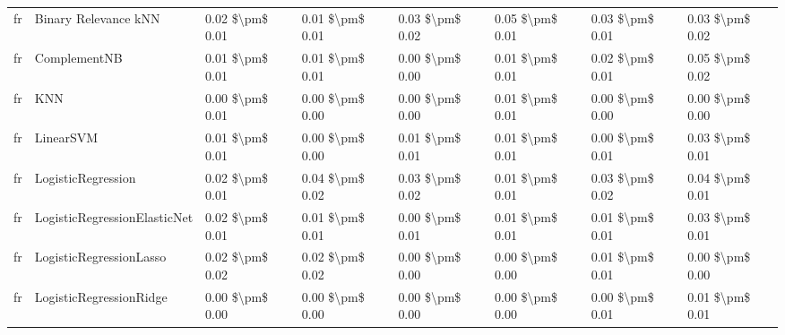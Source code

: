 \begin{tabular}{llllllll}
      fr &            Binary Relevance kNN & 0.02 \$\textbackslash pm\$ 0.01 &           0.01 \$\textbackslash pm\$ 0.01 &       0.03 \$\textbackslash pm\$ 0.02 &        0.05 \$\textbackslash pm\$ 0.01 &                         0.03 \$\textbackslash pm\$ 0.01 &     0.03 \$\textbackslash pm\$ 0.02 \\
      fr &                    ComplementNB & 0.01 \$\textbackslash pm\$ 0.01 &           0.01 \$\textbackslash pm\$ 0.01 &       0.00 \$\textbackslash pm\$ 0.00 &        0.01 \$\textbackslash pm\$ 0.01 &                         0.02 \$\textbackslash pm\$ 0.01 &     0.05 \$\textbackslash pm\$ 0.02 \\
      fr &                             KNN & 0.00 \$\textbackslash pm\$ 0.01 &           0.00 \$\textbackslash pm\$ 0.00 &       0.00 \$\textbackslash pm\$ 0.00 &        0.01 \$\textbackslash pm\$ 0.01 &                         0.00 \$\textbackslash pm\$ 0.00 &     0.00 \$\textbackslash pm\$ 0.00 \\
      fr &                       LinearSVM & 0.01 \$\textbackslash pm\$ 0.01 &           0.00 \$\textbackslash pm\$ 0.00 &       0.01 \$\textbackslash pm\$ 0.01 &        0.01 \$\textbackslash pm\$ 0.01 &                         0.00 \$\textbackslash pm\$ 0.01 &     0.03 \$\textbackslash pm\$ 0.01 \\
      fr &              LogisticRegression & 0.02 \$\textbackslash pm\$ 0.01 &           0.04 \$\textbackslash pm\$ 0.02 &       0.03 \$\textbackslash pm\$ 0.02 &        0.01 \$\textbackslash pm\$ 0.01 &                         0.03 \$\textbackslash pm\$ 0.02 &     0.04 \$\textbackslash pm\$ 0.01 \\
      fr &    LogisticRegressionElasticNet & 0.02 \$\textbackslash pm\$ 0.01 &           0.01 \$\textbackslash pm\$ 0.01 &       0.00 \$\textbackslash pm\$ 0.01 &        0.01 \$\textbackslash pm\$ 0.01 &                         0.01 \$\textbackslash pm\$ 0.01 &     0.03 \$\textbackslash pm\$ 0.01 \\
      fr &         LogisticRegressionLasso & 0.02 \$\textbackslash pm\$ 0.02 &           0.02 \$\textbackslash pm\$ 0.02 &       0.00 \$\textbackslash pm\$ 0.00 &        0.00 \$\textbackslash pm\$ 0.00 &                         0.01 \$\textbackslash pm\$ 0.01 &     0.00 \$\textbackslash pm\$ 0.00 \\
      fr &         LogisticRegressionRidge & 0.00 \$\textbackslash pm\$ 0.00 &           0.00 \$\textbackslash pm\$ 0.00 &       0.00 \$\textbackslash pm\$ 0.00 &        0.00 \$\textbackslash pm\$ 0.00 &                         0.00 \$\textbackslash pm\$ 0.01 &     0.01 \$\textbackslash pm\$ 0.01 \\

\end{tabular}
